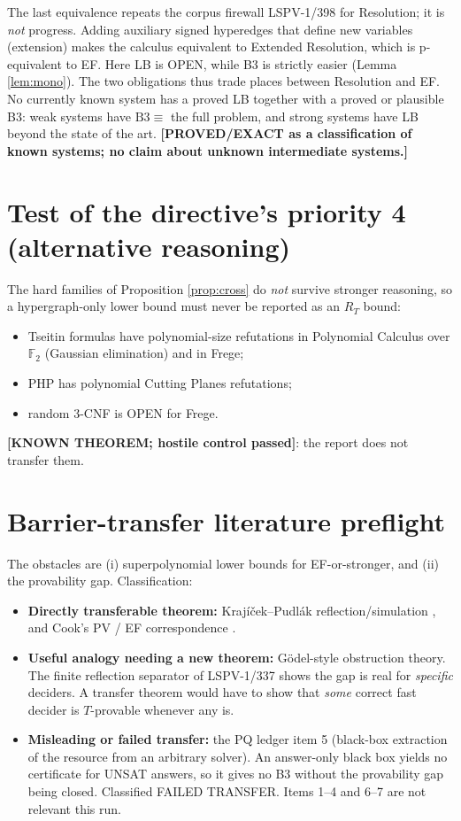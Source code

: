 \documentclass[11pt]{article}
\theoremstyle{definition}
\theoremstyle{remark}
\newcommand{\status}[1]{\textbf{[#1]}}
\begin{document}
The last equivalence repeats the corpus firewall LSPV-1/398 for Resolution; it is \emph{not}
progress. Adding auxiliary signed hyperedges that define new variables (extension) makes the
calculus equivalent to Extended Resolution, which is p-equivalent to EF. Here LB is OPEN, while
B3 is strictly easier (Lemma \ref{lem:mono}). The two obligations thus trade places between
Resolution and EF. No currently known system has a proved LB together with a proved or plausible
B3: weak systems have $\mathrm{B3}\equiv$ the full problem, and strong systems have LB beyond the
state of the art. \status{PROVED/EXACT as a classification of known systems; no claim about
unknown intermediate systems.}

\section{Test of the directive's priority 4 (alternative reasoning)}

The hard families of Proposition \ref{prop:cross} do \emph{not} survive stronger reasoning, so a
hypergraph-only lower bound must never be reported as an $R_T$ bound:
\begin{itemize}
\item Tseitin formulas have polynomial-size refutations in Polynomial Calculus over
$\mathbb{F}_2$ (Gaussian elimination) and in Frege;
\item PHP has polynomial Cutting Planes refutations;
\item random 3-CNF is OPEN for Frege.
\end{itemize}
\status{KNOWN THEOREM; hostile control passed}: the report does not transfer them.

\section*{Barrier-transfer literature preflight}

The obstacles are (i) superpolynomial lower bounds for EF-or-stronger, and (ii) the provability
gap. Classification:
\begin{itemize}
\item \textbf{Directly transferable theorem:} Krajíček--Pudlák reflection/simulation
\cite{KP89}, and Cook's PV / EF correspondence \cite{Coo75}.
\item \textbf{Useful analogy needing a new theorem:} Gödel-style obstruction theory. The finite
reflection separator of LSPV-1/337 shows the gap is real for \emph{specific} deciders. A transfer
theorem would have to show that \emph{some} correct fast decider is $T$-provable whenever any is.
\item \textbf{Misleading or failed transfer:} the PQ ledger item 5 (black-box extraction of the
resource from an arbitrary solver). An answer-only black box yields no certificate for UNSAT
answers, so it gives no B3 without the provability gap being closed. Classified FAILED TRANSFER.
Items 1--4 and 6--7 are not relevant this run.
\end{itemize}
\end{document}
